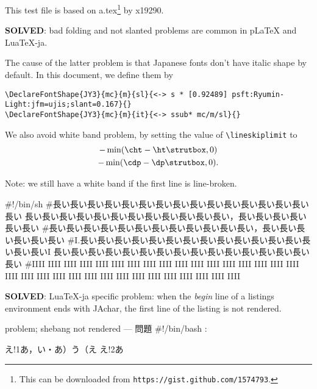 \documentclass{article}
\def\cs#1{\hbox{\texttt{\textbackslash #1}}}
\begin{document}
This test file is based on a.tex\footnote{This can be downloaded from {\tt https://gist.github.com/1574793}.} by x19290.


\textbf{SOLVED}: bad folding and not slanted problems are common in pLaTeX and LuaTeX-ja.

The cause of the latter problem is that Japanese fonts don't have italic shape by default.
In this document, we define them by
\begin{lstlisting}[language={[AlLaTeX]TeX}, basicstyle=\ttfamily]
\DeclareFontShape{JY3}{mc}{m}{sl}{<-> s * [0.92489] psft:Ryumin-Light:jfm=ujis;slant=0.167}{}
\DeclareFontShape{JY3}{mc}{m}{it}{<-> ssub* mc/m/sl}{}
\end{lstlisting}
\newpage

We also avoid white band problem, by setting the value of \cs{lineskiplimit} to
\begin{multline}
 -\min(\cs{cht}-\cs{ht}\cs{strutbox}, 0)\\
 -\min(\cs{cdp}-\cs{dp}\cs{strutbox}, 0).
\end{multline}

Note: we still have a white band if the first line is line-broken.

\begin{env}{\relax}
#!/bin/sh
#長い長い長い長い長い長い長い長い長い長い長い長い長い長い長い長い
長い長い長い長い長い長い長い長い長い長い長い長い，長い長い長い長い長い長い
#長い長い長い長い長い長い長い長い長い長い長い長い，長い長い長い長い長い長い
#I.長い長い長い長い長い長い長い長い長い長い長い長い長い長い長い長いI
長い長い長い長い長い長い長い長い長い長い長い長い長い長い長い長い
#IIII IIII IIII IIII IIII IIII IIII IIII IIII IIII IIII IIII IIII IIII IIII IIII
IIII IIII IIII IIII IIII IIII IIII IIII IIII IIII IIII IIII IIII IIII IIII IIII
\end{env}

\newpage

\textbf{SOLVED}: LuaTeX-ja specific problem:
when the \emph{begin} line of a listings environment ends with JAchar,
the first line of the listing is not rendered.

\begin{env}{problem; shebang not rendered --- 問題}
#!/bin/bash
:
\end{env}

\begin{LTXexample}[language=TeX]
え!1あ，い・あ）う（え
え!2あ
\end{LTXexample}


\end{document}
